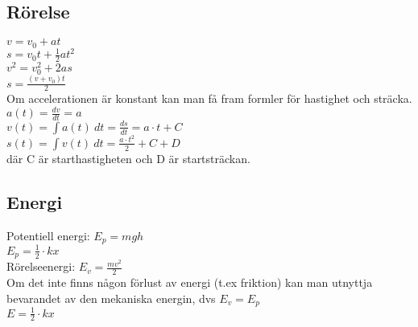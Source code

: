 \subsection{Rörelse}
    \begin{math}
        v = v_0 + at
    \end{math} \\[2pt]
    \begin{math}
        s = v_0 t + \frac{1}{2} at^2
    \end{math} \\[2pt]
    \begin{math}
        v^2 = v_0^2 + 2as
    \end{math} \\[2pt]
    \begin{math}
        s = \frac{(v + v_0)t}{2}
    \end{math} \\[2pt]
    Om accelerationen är konstant kan man få fram formler för hastighet och sträcka. \\
    \begin{math}
        a(t) = \frac{dv}{dt} = a
    \end{math} \\[2pt]
    \begin{math}
        v(t) = \int a(t) \ dt = \frac{ds}{dt} = a \cdot t + C
    \end{math} \\[2pt]
    \begin{math}
        s(t) = \int v(t) \ dt = \frac{a \cdot t^2}{2} + C + D
    \end{math} \\[2pt]
    där C är starthastigheten och D är startsträckan.

\subsection{Energi}
Potentiell energi:
\begin{math}
    E_p = mgh
\end{math} \\[2pt]
\begin{math}
    E_p = \frac{1}{2} \cdot kx
\end{math} \\[2pt]
Rörelseenergi:
\begin{math}
    E_v = \frac{mv^2}{2}
\end{math} \\[2pt]
Om det inte finns någon förlust av energi (t.ex friktion) kan man utnyttja bevarandet av den mekaniska energin, dvs 
\begin{math}
    E_v = E_p
\end{math} \\[2pt]
\begin{math}
    E = \frac{1}{2} \cdot kx
\end{math} \\[2pt]

